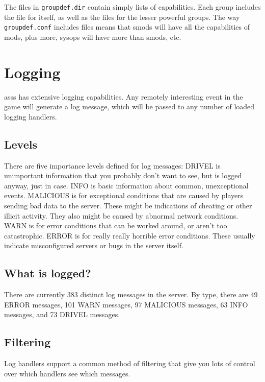 \documentclass{article}
\newcommand{\asss}{asss}
\begin{document}
The files in \verb/groupdef.dir/ contain simply lists of capabilities.
Each group includes the file for itself, as well as the files for the
lesser powerful groups. The way \verb/groupdef.conf/ includes files
means that smods will have all the capabilities of mods, plus more,
sysops will have more than smods, etc.


\section{Logging}

\asss{} has extensive logging capabilities. Any remotely interesting
event in the game will generate a log message, which will be passed to
any number of loaded logging handlers.

\subsection{Levels}

There are five importance levels defined for log messages: DRIVEL is
unimportant information that you probably don't want to see, but is
logged anyway, just in case. INFO is basic information about common,
unexceptional events. MALICIOUS is for exceptional conditions that are
caused by players sending bad data to the server. These might be
indications of cheating or other illicit activity. They also might be
caused by abnormal network conditions. WARN is for error conditions that
can be worked around, or aren't too catastrophic. ERROR is for really
really horrible error conditions. These usually indicate misconfigured
servers or bugs in the server itself.

\subsection{What is logged?}

There are currently
383
distinct log messages in the server. By type, there are 49 ERROR
messages, 101 WARN messages, 97 MALICIOUS messages, 63 INFO messages, and
73 DRIVEL messages.

\subsection{Filtering}

Log handlers support a common method of filtering that give you lots of
control over which handlers see which messages.
\end{document}
